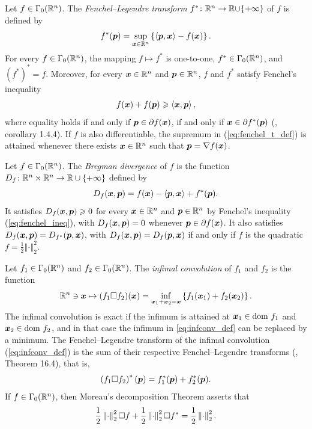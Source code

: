 %
\begin{defn} \label{def:legendre_t} 
Let $f\in\Gamma_0(\mathbb{R}^n)$. The \textit{Fenchel--Legendre transform} $f^{*}\colon\mathbb{R}^n\to\mathbb{R\cup}\{+\infty\}$ of $f$ is defined by
\begin{equation}
f^{*}(\boldsymbol{p})=\sup_{\boldsymbol{x}\in\mathbb{R}^n}\left\{ \left\langle \boldsymbol{p},\boldsymbol{x}\right\rangle -f(\boldsymbol{x})\right\} .\label{eq:fenchel_t_def}
\end{equation}
For every $f\in\Gamma_0(\mathbb{R}^n)$, the mapping $f\mapsto f^{*}$ is one-to-one, $f^{*}\in\Gamma_0(\mathbb{R}^n)$, and $(f^{*})^{*}=f$. Moreover, for every $\boldsymbol{x}\in\mathbb{R}^n$ and $\boldsymbol{p}\in\mathbb{R}^n$, $f$ and $f^*$ satisfy Fenchel's inequality
\begin{equation} \label{eq:fenchel_ineq}
f(\boldsymbol{x})+f(\boldsymbol{p})\geqslant\left\langle \boldsymbol{x},\boldsymbol{p}\right\rangle,
\end{equation}
where equality holds if and only if $\boldsymbol{p}\in\partial f(\boldsymbol{x})$, if and only if $\boldsymbol{x}\in\partial f^{*}(\boldsymbol{p})$ (\citep{hiriart2013convexII}, corollary 1.4.4). If $f$ is also differentiable, the supremum in (\ref{eq:fenchel_t_def}) is attained whenever there exists $\boldsymbol{x}\in\mathbb{R}^n$ such that $\boldsymbol{p}=\nabla f(\boldsymbol{x})$. 
\end{defn}
%
\begin{defn} \label{def:breg_div} 
Let $f\in\Gamma_0(\mathbb{R}^n)$. The \textit{Bregman divergence} of $f$ is the function $D_{f}\colon\mathbb{R}^n\times\mathbb{R}^n\to\mathbb{R}\cup\{+\infty\}$ defined by
\begin{equation}
D_{f}(\boldsymbol{x},\boldsymbol{p})=f(\boldsymbol{x})-\left\langle \boldsymbol{p},\boldsymbol{x}\right\rangle +f^{*}(\boldsymbol{p}).\label{eq:breg_good_def}
\end{equation}
It satisfies $D_{f}(\boldsymbol{x},\boldsymbol{p})\geqslant0$ for every $\boldsymbol{x}\in\mathbb{R}^n$ and $\boldsymbol{p}\in\mathbb{R}^n$ by Fenchel's inequality (\ref{eq:fenchel_ineq}), with $D_{f}(\boldsymbol{x},\boldsymbol{p})=0$ whenever $\boldsymbol{p}\in\partial f(\boldsymbol{x})$. It also satisfies $D_{f}(\boldsymbol{x},\boldsymbol{p})=D_{f^{*}}(\boldsymbol{p},\boldsymbol{x})$, with $D_{f}(\boldsymbol{x},\boldsymbol{p})=D_{f}(\boldsymbol{p},\boldsymbol{x})$ if and only if $f$ is the quadratic $f=\frac{1}{2}\left\Vert \cdot\right\Vert _{2}^{2}$.
\end{defn}
%
\begin{defn} \label{def:inf_conv}
Let $f_{1}\in\Gamma_0(\mathbb{R}^n)$ and $f_{2}\in\Gamma_0(\mathbb{R}^n)$. The \textit{infimal convolution} of $f_{1}$ and $f_{2}$ is the function
\begin{equation}\label{eq:infconv_def}
\mathbb{R}^n \ni \boldsymbol{x} \mapsto (f_{1} \Box f_{2})(\boldsymbol{x}) = \inf_{\boldsymbol{x}_{1}+\boldsymbol{x}_{2}=\boldsymbol{x}}\left\{ f_{1}(\boldsymbol{x}_{1})+f_{2}(\boldsymbol{x}_{2})\right\}.
\end{equation}
The infimal convolution is exact if the infimum is attained at $\boldsymbol{x}_{1}\in\mathrm{dom~} f_{1}$ and $\boldsymbol{x}_{2}\in\mathrm{dom~} f_{2}$, and in that case the infimum in \eqref{eq:infconv_def} can be replaced by a minimum. The Fenchel--Legendre transform of the infimal convolution (\ref{eq:infconv_def}) is the sum of their respective Fenchel--Legendre transforms (\citep{rockafellar1970convex}, Theorem 16.4), that is,
\[
\left(f_{1}\Box f_{2}\right)^{*}(\boldsymbol{p})=f_{1}^{*}(\boldsymbol{p})+f_{2}^{*}(\boldsymbol{p}).
\]
%
If $f \in \Gamma_0(\mathbb{R}^n)$, then Moreau's decomposition Theorem \cite{hiriart1989moreau,moreau1965proximite} asserts that
\[
\frac{1}{2}\left\Vert{\cdot} \right\Vert_{2}^{2}\Box f + \frac{1}{2}\left\Vert{\cdot} \right\Vert_{2}^{2}\Box f^* = \frac{1}{2}\left\Vert{\cdot} \right\Vert_{2}^{2}.
\]
\end{defn}
